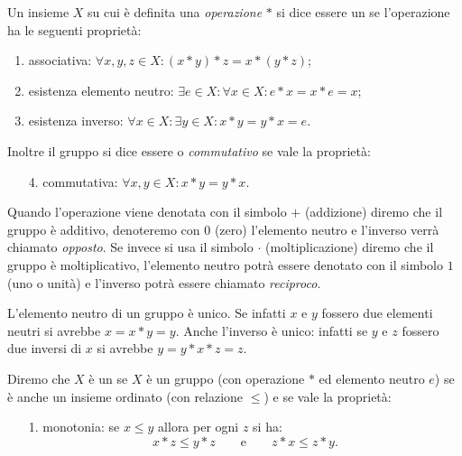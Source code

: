 \begin{definition}[gruppo]
  Un insieme $X$ su cui è definita una \emph{operazione} $*$ 
  si dice essere un  se l'operazione
  ha le seguenti proprietà:
  \begin{enumerate}
    \item associativa: $\forall x,y,z\in X\colon (x*y)*z = x*(y*z)$;
    \item esistenza elemento neutro: 
    $\exists e\in X\colon \forall x\in X \colon e*x=x*e = x$;
    \item esistenza inverso: 
    $\forall x\in X\colon \exists y\in X\colon x*y=y*x=e$.
  \end{enumerate}
  Inoltre il gruppo si dice essere  o \emph{commutativo}
  se vale la proprietà:
  \begin{enumerate}
    \item[4.] commutativa: $\forall x,y\in X\colon x*y = y*x$.
  \end{enumerate}
  
  Quando l'operazione viene denotata con il simbolo $+$ (addizione)
  diremo che il gruppo è additivo, denoteremo con $0$ 
  (zero) l'elemento neutro e l'inverso verrà chiamato \emph{opposto}.
  Se invece si usa il simbolo $\cdot$ (moltiplicazione)
  diremo che il gruppo è moltiplicativo, l'elemento neutro potrà 
  essere denotato con il simbolo $1$ (uno o unità) e 
  l'inverso potrà essere chiamato \emph{reciproco}.
  \end{definition}
  
  L'elemento neutro di un gruppo è unico. 
  Se infatti $x$ e $y$ fossero due elementi neutri 
  si avrebbe $x = x*y = y$. 
  Anche l'inverso è unico: infatti se $y$ e $z$ fossero 
  due inversi di $x$ si avrebbe $y = y * x * z = z$.
  
  \begin{definition}
    Diremo che $X$ è un  se $X$ è un gruppo
    (con operazione $*$ ed elemento neutro $e$) 
    se è anche un insieme ordinato (con relazione $\le$)
    e se vale la proprietà:
    \begin{enumerate}
      \item[1.] monotonia: se $x\le y$ allora per ogni $z$ si ha:
       \[
       x*z \le y*z \qquad\text{e}\qquad z*x \le z*y.
       \] 
    \end{enumerate}
  \end{definition}
  
